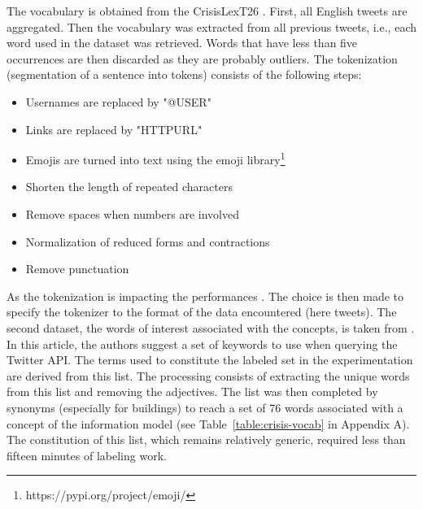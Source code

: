 The vocabulary is obtained from the CrisisLexT26 \parencite{olteanuWhatExpectWhen2015}.
First, all English tweets are aggregated.
Then the vocabulary was extracted from all previous tweets, i.e., each word used in the dataset was retrieved.
Words that have less than five occurrences are then discarded as they are probably outliers.
The tokenization (segmentation of a sentence into tokens) consists of the following steps:

\begin{itemize}
    \item Usernames are replaced by "@USER"
    \item Links are replaced by "HTTPURL"
    \item Emojis are turned into text using the emoji library\footnote{https://pypi.org/project/emoji/}
    \item Shorten the length of repeated characters
    \item Remove spaces when numbers are involved
    \item Normalization of reduced forms and contractions
    \item Remove punctuation
\end{itemize}

As the tokenization is impacting the performances \parencite[p. 21]{farzindarNaturalLanguageProcessing2017}.
The choice is then made to specify the tokenizer to the format of the data encountered (here tweets).
The second dataset, the words of interest associated with the concepts, is taken from \textcite{olteanuCrisisLexLexiconCollecting2014}.
In this article, the authors suggest a set of keywords to use when querying the Twitter API.
The terms used to constitute the labeled set in the experimentation are derived from this list.
The processing consists of extracting the unique words from this list and removing the adjectives.
The list was then completed by synonyms (especially for buildings) to reach a set of 76 words associated with a concept of the information model (see Table~\ref{table:crisis-vocab} in Appendix A).
The constitution of this list, which remains relatively generic, required less than fifteen minutes of labeling work.

